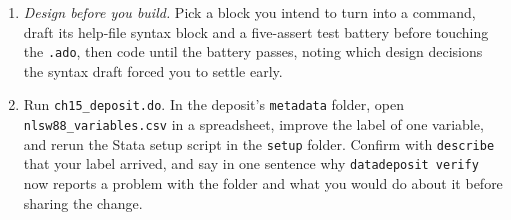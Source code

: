 \begin{enumerate}
    \item \emph{Design before you build.} Pick a block you intend to turn into a command, draft its help-file syntax block and a five-assert test battery before touching the \texttt{.ado}, then code until the battery passes, noting which design decisions the syntax draft forced you to settle early.
    \item Run \texttt{ch15\_deposit.do}. In the deposit's \texttt{metadata} folder, open \texttt{nlsw88\_variables.csv} in a spreadsheet, improve the label of one variable, and rerun the Stata setup script in the \texttt{setup} folder. Confirm with \texttt{describe} that your label arrived, and say in one sentence why \texttt{datadeposit verify} now reports a problem with the folder and what you would do about it before sharing the change.
\end{enumerate}
